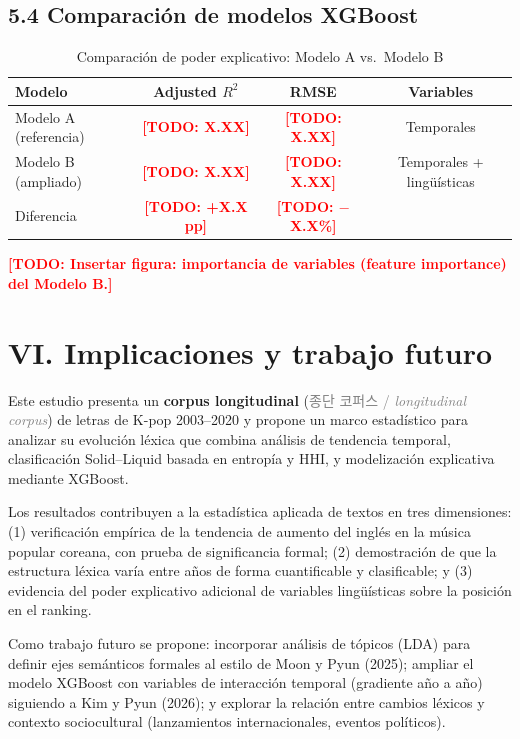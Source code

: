 \documentclass[11pt,a4paper]{article}
\newcommand{\term}[3]{\textbf{#1} (\textcolor{gray}{#2 / \textit{#3}})}
\newcommand{\todo}[1]{\textcolor{red}{\textbf{[TODO: #1]}}}
\begin{document}
\subsection*{5.4 Comparación de modelos XGBoost}

\begin{table}[H]
\centering
\small
\begin{tabular}{lccc}
\toprule
\textbf{Modelo} & \textbf{Adjusted $R^2$} & \textbf{RMSE} & \textbf{Variables} \\
\midrule
Modelo A (referencia) & \todo{X.XX} & \todo{X.XX} & Temporales \\
Modelo B (ampliado)   & \todo{X.XX} & \todo{X.XX} & Temporales + lingüísticas \\
\midrule
Diferencia            & \todo{+X.X pp} & \todo{$-$X.X\%} & \\
\bottomrule
\end{tabular}
\caption{Comparación de poder explicativo: Modelo A vs.\ Modelo B}
\end{table}

\todo{Insertar figura: importancia de variables (feature importance) del Modelo B.}

\section*{VI. Implicaciones y trabajo futuro}

Este estudio presenta un \term{corpus longitudinal}{종단 코퍼스}{longitudinal corpus}
de letras de K-pop 2003--2020 y propone un marco estadístico para analizar
su evolución léxica que combina análisis de tendencia temporal,
clasificación Solid--Liquid basada en entropía y HHI, y modelización
explicativa mediante XGBoost.

Los resultados contribuyen a la estadística aplicada de textos en tres dimensiones:
(1) verificación empírica de la tendencia de aumento del inglés en la
música popular coreana, con prueba de significancia formal;
(2) demostración de que la estructura léxica varía entre años de forma
cuantificable y clasificable; y
(3) evidencia del poder explicativo adicional de variables lingüísticas
sobre la posición en el ranking.

Como trabajo futuro se propone:
incorporar análisis de tópicos (LDA) para definir ejes semánticos formales
al estilo de Moon y Pyun (2025);
ampliar el modelo XGBoost con variables de interacción temporal (gradiente
año a año) siguiendo a Kim y Pyun (2026);
y explorar la relación entre cambios léxicos y contexto sociocultural
(lanzamientos internacionales, eventos políticos).
\end{document}
